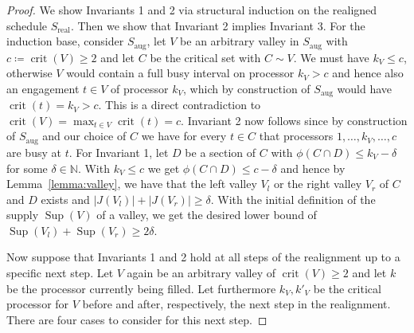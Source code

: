 \documentclass[a4paper]{article}
\DeclareMathOperator{\aug}{aug}
\DeclareMathOperator{\real}{real}
\DeclareMathOperator{\crit}{crit}
\DeclareMathOperator{\fillop}{fill}
\DeclareMathOperator{\res}{Sup}
\begin{document}
\begin{proof}
  We show Invariants 1 and 2 via structural induction on the realigned schedule $S_{\real}$.
  Then we show that Invariant 2 implies Invariant 3.
  For the induction base, consider $S_{\aug}$, let $V$ be an arbitrary valley in $S_{\aug}$ with $c \coloneqq \crit(V) \geq 2$ and let $C$ be the critical set with $C \sim V$.
  We must have $k_V \leq c$, otherwise $V$ would contain a full busy interval on processor $k_V > c$ and hence also an engagement $t \in V$ of processor $k_V$, which by construction of $S_{\aug}$ would have $\crit(t) = k_V > c$.
  This is a direct contradiction to $\crit(V) = \max_{t \in V} \crit(t) = c$.
  Invariant 2 now follows since by construction of $S_{\aug}$ and our choice of $C$ we have for every $t \in C$ that processors $1, \ldots, k_V, \ldots, c$ are busy at $t$.
  For Invariant 1, let $D$ be a section of $C$ with $\phi(C \cap D) \leq k_V - \delta$ for some $\delta \in \mathbb{N}$.
  With $k_V \leq c$ we get $\phi(C \cap D) \leq c - \delta$ and hence by Lemma~\ref{lemma:valley}, we have that the left valley $V_l$ or the right valley $V_r$ of $C$ and $D$ exists and $|J(V_l)| + |J(V_r)| \geq \delta$.
  With the initial definition of the supply $\res(V)$ of a valley, we get the desired lower bound of $\res(V_l) + \res(V_r) \geq 2 \delta$.

  Now suppose that Invariants 1 and 2 hold at all steps of the realignment up to a specific next step.
  Let $V$ again be an arbitrary valley of $\crit(V) \geq 2$ and let $k$ be the processor currently being filled.
  Let furthermore $k_V, k'_V$ be the critical processor for $V$ before and after, respectively, the next step in the realignment.
  There are four cases to consider for this next step.


\end{proof}
\end{document}
